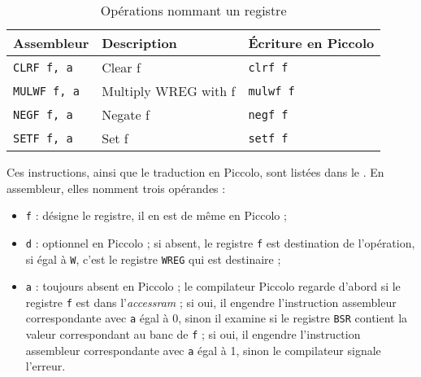 \begin{table}[!ht]
  \centering
  \small
  \begin{tabular}{lll}
    \textbf{Assembleur} & \textbf{Description} & \textbf{Écriture en Piccolo}\\
    \hline
    \texttt{CLRF f, a} & Clear f & \texttt{clrf f} \\
    \texttt{MULWF f, a} & Multiply WREG with f & \texttt{mulwf f} \\
    \texttt{NEGF f, a} & Negate f & \texttt{negf f} \\
    \texttt{SETF f, a} & Set f & \texttt{setf f}\\
  \hline
  \end{tabular}
  \caption{Opérations nommant un registre}
\end{table}









Ces instructions, ainsi que le traduction en Piccolo, sont listées dans le . En assembleur, elles nomment trois opérandes :
\begin{itemize}
  \item \texttt{f} : désigne le registre, il en est de même en Piccolo ;
  \item \texttt{d} : optionnel en Piccolo ; si absent, le registre \texttt{f} est destination de l'opération, si égal à \texttt{W}, c'est le registre \texttt{WREG} qui est destinaire ;
  \item \texttt{a} : toujours absent en Piccolo ; le compilateur Piccolo regarde d'abord si le registre \texttt{f} est dans l'\emph{accessram} ; si oui, il engendre l'instruction assembleur correspondante avec \texttt{a} égal à 0, sinon il examine si le registre \texttt{BSR} contient la valeur correspondant au banc de \texttt{f} ; si oui, il engendre l'instruction assembleur correspondante avec \texttt{a} égal à 1, sinon le compilateur signale l'erreur.
\end{itemize}


